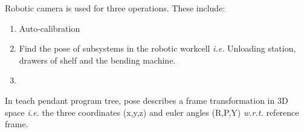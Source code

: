 Robotic camera is used for three operations. These include:
\begin{enumerate}
    \item Auto-calibration
    \item Find the pose of subsystems in the robotic workcell \textit{i.e.} Unloading station, drawers of shelf and the bending machine.
    \item 
\end{enumerate}



In teach pendant program tree, pose describes a frame transformation in 3D space \textit{i.e.} the three coordinates (x,y,z) and euler angles (R,P,Y) \textit{w.r.t.}
reference frame.
